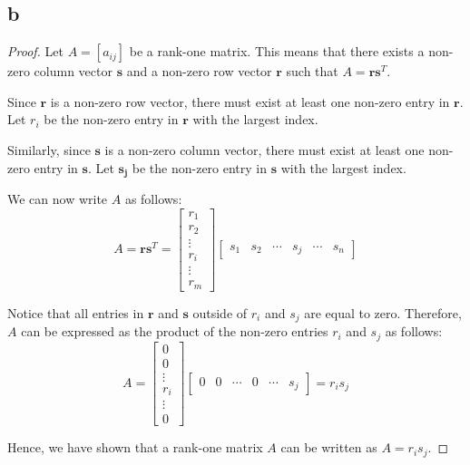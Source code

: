 \subsection{b}
\begin{proof}
    Let $A = [a_{ij}]$ be a rank-one matrix. This means that there exists a non-zero column vector $\mathbf{s}$ and a non-zero row vector $\mathbf{r}$ such that $A = \mathbf{r} \mathbf{s}^T$.
    
    Since $\mathbf{r}$ is a non-zero row vector, there must exist at least one non-zero entry in $\mathbf{r}$. Let $r_i$ be the non-zero entry in $\mathbf{r}$ with the largest index.
    
    Similarly, since $\mathbf{s}$ is a non-zero column vector, there must exist at least one non-zero entry in $\mathbf{s}$. Let $\mathbf{s_j}$ be the non-zero entry in $\mathbf{s}$ with the largest index.
    
    We can now write $A$ as follows:
    \[
    A = \mathbf{r} \mathbf{s}^T = \begin{bmatrix}
    r_1 \\
    r_2 \\
    \vdots \\
    r_i \\
    \vdots \\
    r_m
    \end{bmatrix} \begin{bmatrix}
    s_1 & s_2 & \cdots & s_j & \cdots & s_n
    \end{bmatrix}
    \]
    
    Notice that all entries in $\mathbf{r}$ and $\mathbf{s}$ outside of $r_i$ and $s_j$ are equal to zero. Therefore, $A$ can be expressed as the product of the non-zero entries $r_i$ and $s_j$ as follows:
    \[
    A = \begin{bmatrix}
    0 \\
    0 \\
    \vdots \\
    r_i \\
    \vdots \\
    0
    \end{bmatrix} \begin{bmatrix}
    0 & 0 & \cdots & 0 & \cdots & s_j
    \end{bmatrix} = r_i s_j
    \]
    
    Hence, we have shown that a rank-one matrix $A$ can be written as $A = r_i s_j$.
    \end{proof}
    

        
    
    
